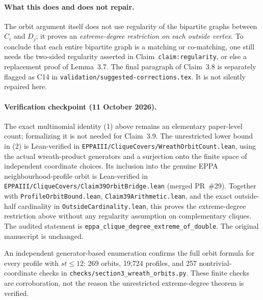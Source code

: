 \documentclass[11pt,a4paper]{article}
\begin{document}
\paragraph{What this does and does not repair.}
The orbit argument itself does not use
regularity of the bipartite graphs
between \(C_i\) and \(D_j\); it proves
an \emph{extreme-degree restriction on
each outside vertex}. To conclude that
each entire bipartite graph is a matching
or co-matching, one still needs the
two-sided regularity asserted in
Claim~\texttt{claim:regularity}, or else
a replacement proof of Lemma~3.7.
The final paragraph of Claim~3.8
is separately flagged as C14 in
\texttt{validation/suggested-corrections.tex}.
It is not silently repaired here.

\paragraph{Verification checkpoint (11 October 2026).}
The exact multinomial identity (1) above remains an elementary
paper-level count; formalizing it is not needed for Claim~3.9.
The unrestricted lower bound in (2) is Lean-verified in
\texttt{EPPAIII/CliqueCovers/WreathOrbitCount.lean}, using
the actual wreath-product generators and a surjection onto
the finite space of independent coordinate choices.
Its inclusion into the genuine EPPA neighbourhood-profile orbit
is Lean-verified in
\texttt{EPPAIII/CliqueCovers/Claim39OrbitBridge.lean}
(merged PR~\#29). Together with
\texttt{ProfileOrbitBound.lean},
\texttt{Claim39Arithmetic.lean}, and the exact
outside-half cardinality in
\texttt{OutsideCardinality.lean},
this proves the extreme-degree restriction above without any
regularity assumption on complementary cliques.
The audited statement is
\texttt{eppa\_clique\_degree\_extreme\_of\_double}.
The original manuscript is unchanged.

An independent generator-based enumeration confirms the
full orbit formula for every profile with \(st\le12\):
269 orbits, 19,724 profiles, and 257 nontrivial-coordinate checks
in \texttt{checks/section3\_wreath\_orbits.py}.
These finite checks are corroboration, not the reason the
unrestricted extreme-degree theorem is verified.
\end{document}
